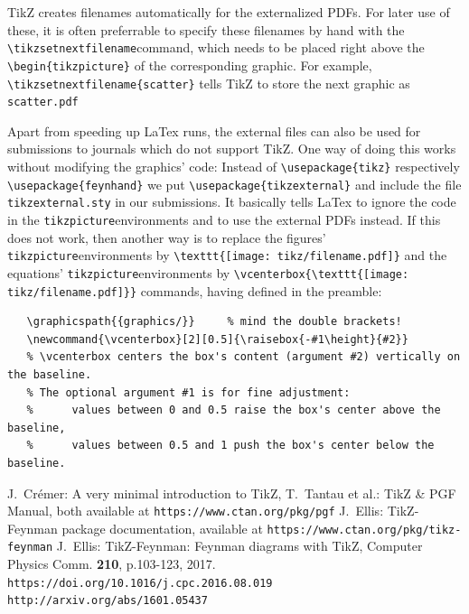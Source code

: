 \documentclass[10pt,letterpaper,twoside,notitlepage]{article}
\numberwithin{figure}{section}
\begin{document}
TikZ creates filenames automatically for the externalized PDFs.
For later use of these, it is often preferrable
to specify these filenames by hand with the
\brocol\verb$\tikzsetnextfilename$\txcol command,
which needs to be placed right above
the \brocol\verb$\begin{tikzpicture}$\txcol
of the corresponding graphic.
For example, \brocol\verb$\tikzsetnextfilename{scatter}$\txcol
tells TikZ to store the next graphic as \brocol\verb$scatter.pdf$\txcol

Apart from speeding up LaTex runs, the external files can also be used
for submissions to journals which do not support TikZ.
One way of doing this works without modifying the graphics' code:
Instead of \brocol\verb$\usepackage{tikz}$\txcol
respectively \brocol\verb$\usepackage{feynhand}$\txcol
we put \brocol\verb$\usepackage{tikzexternal}$\txcol
and include the file \brocol\verb$tikzexternal.sty$\txcol
in our submissions. It basically tells LaTex to ignore
the code in the \brocol\verb$tikzpicture$\txcol environments
and to use the external PDFs instead.
%
If this does not work, then another way is to replace the figures' 
\brocol\verb$tikzpicture$\txcol environments by
\brocol\verb$\texttt{[image: tikz/filename.pdf]}$\txcol 
and the equations' \brocol\verb$tikzpicture$\txcol environments
by \brocol\verb$\vcenterbox{\texttt{[image: tikz/filename.pdf]}}$\txcol 
commands, having defined in the preamble:
%
\brocol
\begin{verbatim}
   \graphicspath{{graphics/}}     % mind the double brackets!
   \newcommand{\vcenterbox}[2][0.5]{\raisebox{-#1\height}{#2}}
   % \vcenterbox centers the box's content (argument #2) vertically on the baseline.
   % The optional argument #1 is for fine adjustment:
   %      values between 0 and 0.5 raise the box's center above the baseline,
   %      values between 0.5 and 1 push the box's center below the baseline.
\end{verbatim}
\txcol
%
%
\begin{thebibliography}{}
%
 J.~Cr{\'emer}: A very minimal introduction to TikZ,\;
	T.~Tantau et al.: TikZ {\&} PGF Manual,\newline
	both available at \texttt{https://www.ctan.org/pkg/pgf}
%
 J.~Ellis: TikZ-Feynman package documentation,%
	available at \texttt{https://www.ctan.org/pkg/tikz-feynman}
%
 J.~Ellis: TikZ-Feynman: Feynman diagrams with TikZ,
   Computer Physics Comm. \textbf{210}, p.103-123, 2017.\newline
	\texttt{https://doi.org/10.1016/j.cpc.2016.08.019}\newline
	\texttt{http://arxiv.org/abs/1601.05437}
%
\end{thebibliography}{}
%
%
%
\end{document}
